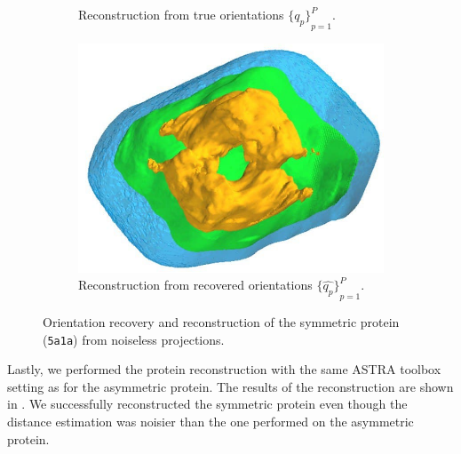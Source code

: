 \begin{figure}[ht!]
\begin{subfigure}[b]{0.25\textwidth}
        \caption{Reconstruction from true orientations ${\big\{q_p\big\}}_{p=1}^P$.}
    \end{subfigure}
    \hfill
    \begin{subfigure}[b]{0.25\textwidth}
        \centering
        \includegraphics[width=0.99\linewidth]{figures/5a1a_aligned}
        \caption{Reconstruction from recovered orientations ${\big\{\widehat{q_p}\big\}}_{p=1}^P$.}
    \end{subfigure}
    \caption{
        Orientation recovery and reconstruction of the symmetric protein (\texttt{5a1a}) from noiseless projections.
    }\label{fig:5a1a-orientation-recovery-loss}
    \label{fig:angle-alignment-5a1a-noise0}
    \label{fig:5a1a-reconstruction-noise0}
\end{figure}

Lastly, we performed the protein reconstruction with the same ASTRA toolbox setting as for the asymmetric protein.
The results of the reconstruction are shown in .
We successfully reconstructed the symmetric protein even though the distance estimation was noisier than the one performed on the asymmetric protein.

